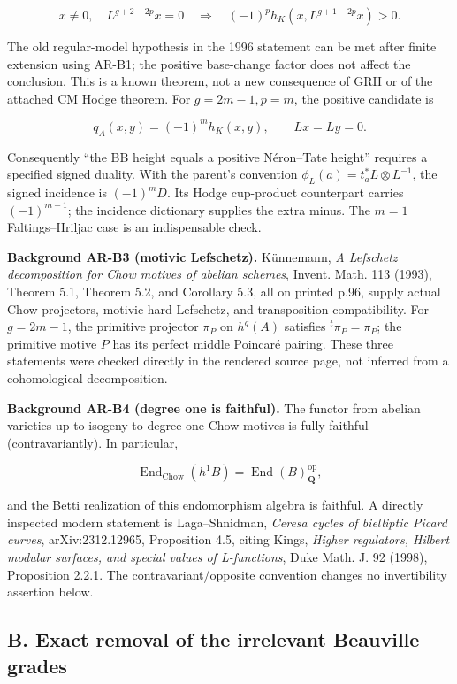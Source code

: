 \[
 x\ne0,\quad L^{g+2-2p}x=0
 \quad\Longrightarrow\quad
 (-1)^p h_K(x,L^{g+1-2p}x)>0.
\]

The old regular-model hypothesis in the 1996 statement can be met after
finite extension using AR-B1; the positive base-change factor does not
affect the conclusion. This is a known theorem, not a new consequence of
GRH or of the attached CM Hodge theorem. For \(g=2m-1,p=m\), the
positive candidate is

\[
q_A(x,y)=(-1)^m h_K(x,y),\qquad Lx=Ly=0.
\tag{AR.1}
\]

Consequently ``the BB height equals a positive Néron--Tate height''
requires a specified signed duality. With the parent's convention
\(\phi_L(a)=t_a^*L\otimes L^{-1}\), the signed incidence is
\((-1)^m D\). Its Hodge cup-product counterpart carries \((-1)^{m-1}\);
the incidence dictionary supplies the extra minus. The \(m=1\)
Faltings--Hriljac case is an indispensable check.

\textbf{Background AR-B3 (motivic Lefschetz).} Künnemann, \emph{A
Lefschetz decomposition for Chow motives of abelian schemes}, Invent.
Math. 113 (1993), Theorem 5.1, Theorem 5.2, and Corollary 5.3, all on
printed p.96, supply actual Chow projectors, motivic hard Lefschetz, and
transposition compatibility. For \(g=2m-1\), the primitive projector
\(\pi_P\) on \(h^g(A)\) satisfies \({}^t\pi_P=\pi_P\); the primitive
motive \(P\) has its perfect middle Poincaré pairing. These three
statements were checked directly in the rendered source page, not
inferred from a cohomological decomposition.

\textbf{Background AR-B4 (degree one is faithful).} The functor from
abelian varieties up to isogeny to degree-one Chow motives is fully
faithful (contravariantly). In particular,

\[
\operatorname{End}_{\mathrm{Chow}}(h^1B)=\operatorname{End}(B)_{\mathbf Q}^{\mathrm{op}},
\]

and the Betti realization of this endomorphism algebra is faithful. A
directly inspected modern statement is Laga--Shnidman, \emph{Ceresa
cycles of bielliptic Picard curves}, arXiv:2312.12965, Proposition 4.5,
citing Kings, \emph{Higher regulators, Hilbert modular surfaces, and
special values of L-functions}, Duke Math. J. 92 (1998), Proposition
2.2.1. The contravariant/opposite convention changes no invertibility
assertion below.

\subsection{B. Exact removal of the irrelevant Beauville
grades}\label{b.-exact-removal-of-the-irrelevant-beauville-grades}

